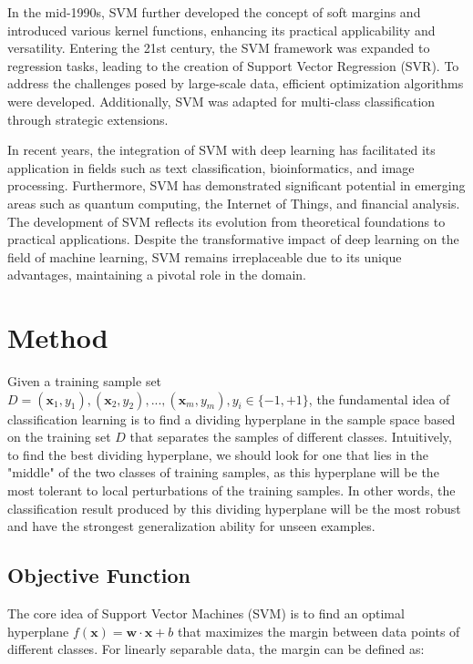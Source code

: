 \documentclass[a4paper, utf8]{ctexart}
\begin{document}
	In the mid-1990s, SVM further developed the concept of soft margins and introduced various kernel functions, enhancing its practical applicability and versatility. Entering the 21st century, the SVM framework was expanded to regression tasks, leading to the creation of Support Vector Regression (SVR). To address the challenges posed by large-scale data, efficient optimization algorithms were developed. Additionally, SVM was adapted for multi-class classification through strategic extensions.
	
	In recent years, the integration of SVM with deep learning has facilitated its application in fields such as text classification, bioinformatics, and image processing. Furthermore, SVM has demonstrated significant potential in emerging areas such as quantum computing, the Internet of Things, and financial analysis. The development of SVM reflects its evolution from theoretical foundations to practical applications. Despite the transformative impact of deep learning on the field of machine learning, SVM remains irreplaceable due to its unique advantages, maintaining a pivotal role in the domain.
	
	\section{Method}
	
	Given a training sample set $D={(\boldsymbol{x}_1, y_1), (\boldsymbol{x}_2, y_2), ... , (\boldsymbol{x}_m, y_m)}, y_i\in\{-1, +1\}$, the fundamental idea of classification learning is to find a dividing hyperplane in the sample space based on the training set $D$ that separates the samples of different classes. Intuitively, to find the best dividing hyperplane, we should look for one that lies in the "middle" of the two classes of training samples, as this hyperplane will be the most tolerant to local perturbations of the training samples. In other words, the classification result produced by this dividing hyperplane will be the most robust and have the strongest generalization ability for unseen examples.
	
	\subsection{Objective Function}
	
	The core idea of Support Vector Machines (SVM) is to find an optimal hyperplane $f(\boldsymbol{x}) = \boldsymbol{w} \cdot \boldsymbol{x} + b$ that maximizes the margin between data points of different classes. For linearly separable data, the margin can be defined as:
	
\end{document}
